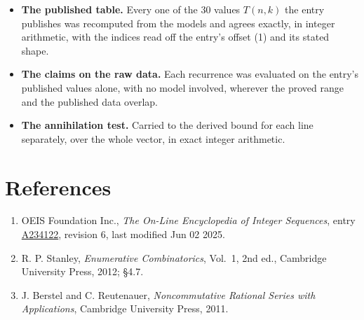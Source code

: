 \documentclass[11pt]{article}
\theoremstyle{definition}
\begin{document}
\begin{itemize}

\item {\bfseries The published table.} Every one of the 30 values $T(n,k)$ the entry publishes was recomputed from the models and agrees exactly, in integer arithmetic, with the indices read off the entry's offset (1) and its stated shape.

\item {\bfseries The claims on the raw data.} Each recurrence was evaluated on the entry's published values alone, with no model involved, wherever the proved range and the published data overlap.

\item {\bfseries The annihilation test.} Carried to the derived bound for each line separately, over the whole vector, in exact integer arithmetic.

\end{itemize}

\section{References}

\begin{enumerate}

\item OEIS Foundation Inc., \emph{The On-Line Encyclopedia of Integer Sequences}, entry \href{https://oeis.org/A234122}{A234122}, revision 6, last modified Jun 02 2025.

\item R. P. Stanley, \emph{Enumerative Combinatorics}, Vol.~1, 2nd ed., Cambridge University Press, 2012; \S4.7.

\item J. Berstel and C. Reutenauer, \emph{Noncommutative Rational Series with Applications}, Cambridge University Press, 2011.

\end{enumerate}
\end{document}
